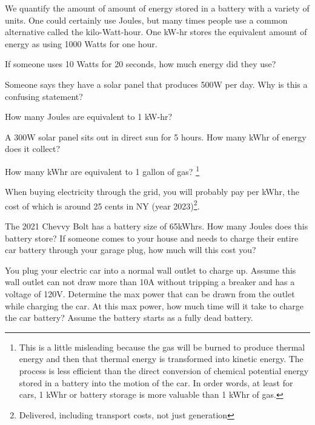 We quantify the amount of amount of energy stored in a battery with a variety of units. One could certainly use Joules, but many times people use a common alternative called the kilo-Watt-hour. One kW-hr stores the equivalent amount of energy as using 1000 Watts for one hour.

\begin{alevel}
If someone uses 10 Watts for 20 seconds, how much energy did they use?
\end{alevel}

\begin{blevel}
Someone says they have a solar panel that produces 500W per day. Why is this a confusing statement?
\end{blevel}

\begin{blevel}
How many Joules are equivalent to 1 kW-hr?
\end{blevel}

\begin{blevel}
A 300W solar panel sits out in direct sun for 5 hours. How many kWhr of energy does it collect?
\end{blevel}

\begin{blevel}
How many kWhr are equivalent to 1 gallon of gas? \footnote{This is a little misleading because the gas will be burned to produce thermal energy and then that thermal energy is transformed into kinetic energy. The process is less efficient than the direct conversion of chemical potential energy stored in a battery into the motion of the car. In order words, at least for cars, 1 kWhr or battery storage is more valuable than 1 kWhr of gas.}
\end{blevel}

When buying electricity through the grid, you will probably pay per kWhr, the cost of which is around 25 cents in NY (year 2023)\footnote{Delivered, including transport costs, not just generation}.

\begin{blevel}
The 2021 Chevvy Bolt has a battery size of 65kWhrs. How many Joules does this battery store? If someone comes to your house and needs to charge their entire car battery through your garage plug, how much will this cost you? 
\end{blevel}

\begin{blevel}
You plug your electric car into a normal wall outlet to charge up. Assume this wall outlet can not draw more than 10A without tripping a breaker and has a voltage of 120V. Determine the max power that can be drawn from the outlet while charging the car. At this max power, how much time will it take to charge the car battery? Assume the battery starts as a fully dead battery. 
\end{blevel}

